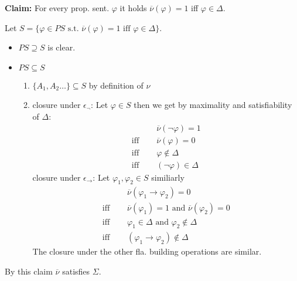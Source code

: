 {\begin{enumerate}
        \textbf{Claim:} For every prop. sent. $\varphi$ it holds $\overline{\nu}(\varphi) =1 $ iff $\varphi\in\Delta$.
        \begin{claimproof}
            Let $S = \{\varphi \in PS \text{ s.t. } \overline{\nu}(\varphi) = 1 \text{ iff } \varphi \in \Delta\}$. \\
            \begin{itemize}
                \item $PS\supseteq S$ is clear.
                \item $PS\subseteq S$ 
                \begin{enumerate}
                    \item $\{A_1,A_2\dots\}\subseteq S$ by definition of $\nu$
                    \item closure under $\epsilon_\lnot$: Let $\varphi\in S$ then we get by maximality and satisfiability of $\Delta$: 
                    \begin{equation*}
                        \begin{split}
                            &\overline{\nu}(\lnot\varphi) = 1\\
                            \text{iff }\quad&\overline{\nu}(\varphi) = 0\\
                            \text{iff }\quad& \varphi \notin \Delta\\
                            \text{iff }\quad& (\lnot \varphi)\in \Delta
                        \end{split}
                    \end{equation*}
                    closure under $\epsilon_\to$: Let $\varphi_1,\varphi_2\in S$ similiarly
                    \begin{equation*}
                        \begin{split}
                            &\overline{\nu}(\varphi_1\to \varphi_2) = 0\\
                            \text{iff }\quad&\overline{\nu}(\varphi_1) = 1 \text{ and } \overline{\nu}(\varphi_2) = 0\\
                            \text{iff }\quad& \varphi_1 \in \Delta \text{ and }\varphi_2 \notin \Delta\\
                            \text{iff }\quad& (\varphi_1\to \varphi_2)\notin \Delta 
                        \end{split}
                    \end{equation*}
                    The closure under the other fla. building operations are similar.\qedhere
                \end{enumerate}
            \end{itemize}
        \end{claimproof}
        By this claim $\overline{\nu}$ satisfies $\Sigma$.\qedhere
    \end{enumerate}
}
